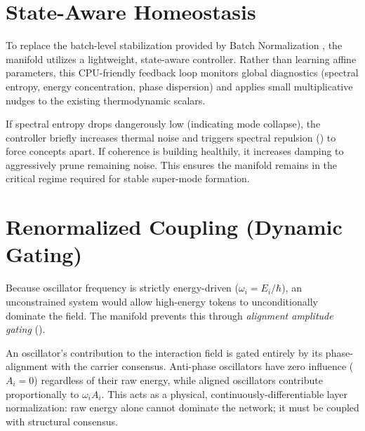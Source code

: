 \documentclass[11pt,a4paper]{article}
\begin{document}




\section{State-Aware Homeostasis}
\label{sec:homeostasis}

To replace the batch-level stabilization provided by Batch Normalization \citep{ioffe2015batch}, the manifold utilizes a lightweight, state-aware controller. Rather than learning affine parameters, this CPU-friendly feedback loop monitors global diagnostics (spectral entropy, energy concentration, phase dispersion) and applies small multiplicative nudges to the existing thermodynamic scalars. 

If spectral entropy drops dangerously low (indicating mode collapse), the controller briefly increases thermal noise and triggers spectral repulsion () to force concepts apart. If coherence is building healthily, it increases damping to aggressively prune remaining noise. This ensures the manifold remains in the critical regime required for stable super-mode formation.





\section{Renormalized Coupling (Dynamic Gating)}
\label{sec:renormalized_coupling}

Because oscillator frequency is strictly energy-driven (\(\omega_i = E_i/\hbar\)), an unconstrained system would allow high-energy tokens to unconditionally dominate the field. The manifold prevents this through \emph{alignment amplitude gating} (). 

An oscillator's contribution to the interaction field is gated entirely by its phase-alignment with the carrier consensus. Anti-phase oscillators have zero influence ($A_i = 0$) regardless of their raw energy, while aligned oscillators contribute proportionally to $\omega_i A_i$. This acts as a physical, continuously-differentiable layer normalization: raw energy alone cannot dominate the network; it must be coupled with structural consensus.
\end{document}
